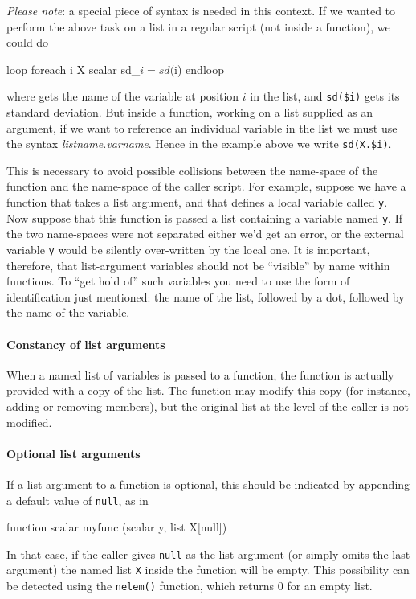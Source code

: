\textit{Please note}: a special piece of syntax is needed in this
context.  If we wanted to perform the above task on a list in a
regular script (not inside a function), we could do
%
\begin{code}
loop foreach i X
   scalar sd_$i = sd($i)
endloop
\end{code}
%
where  gets the name of the variable at position $i$ in the
list, and \verb|sd($i)| gets its standard deviation.  But inside a
function, working on a list supplied as an argument, if we want to
reference an individual variable in the list we must use the syntax
\textsl{listname.varname}.  Hence in the example above we write
\verb|sd(X.$i)|.

This is necessary to avoid possible collisions between the name-space
of the function and the name-space of the caller script.  For example,
suppose we have a function that takes a list argument, and that
defines a local variable called \texttt{y}.  Now suppose that this
function is passed a list containing a variable named \texttt{y}.  If
the two name-spaces were not separated either we'd get an error, or
the external variable \texttt{y} would be silently over-written by the
local one.  It is important, therefore, that list-argument variables
should not be ``visible'' by name within functions.  To ``get hold
of'' such variables you need to use the form of identification just
mentioned: the name of the list, followed by a dot, followed by the
name of the variable.

\paragraph{Constancy of list arguments} When a named list of
variables is passed to a function, the function is actually provided
with a copy of the list.  The function may modify this copy (for
instance, adding or removing members), but the original list at the
level of the caller is not modified.

\paragraph{Optional list arguments} If a list argument to a function is
optional, this should be indicated by appending a default value of
\texttt{null}, as in
%
\begin{code}
function scalar myfunc (scalar y, list X[null])
\end{code}
%
In that case, if the caller gives \texttt{null} as the list argument
(or simply omits the last argument) the named list \texttt{X} inside the
function will be empty.  This possibility can be detected using the
\texttt{nelem()} function, which returns 0 for an empty list.

